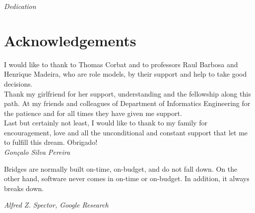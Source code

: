 
\pagestyle{empty}
\begin{center}

\emph{Dedication}

\end{center}

\clearpage
\section*{Acknowledgements}

I would like to thank to Thomas Corbat and to professors Raul Barbosa and Henrique Madeira, who are role models, by their support and help to take good decisions.\\

Thank my girlfriend for her support, understanding and the fellowship along this path. At my friends and colleagues of Department of Informatics Engineering for the patience and for all times they have given me support. \\

Last but certainly not least, I would like to thank to my family for encouragement, love and all the unconditional and constant support that let me to fulfill this dream. Obrigado!\\



\emph{\hfill Gonçalo Silva Pereira}

\clearpage

\vspace*{\fill}
\pagestyle{empty}

\begin{shadequote}
Bridges are normally built on-time, on-budget, and do not
fall down. On the other hand, software never comes in on-time
or on-budget. In addition, it always breaks down.\par\emph{Alfred Z. Spector, Google Research}
\end{shadequote}

